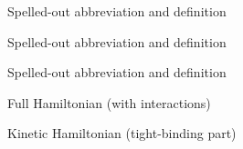 \begin{description}[PUTLONGEST]
    \item[ABC]{Spelled-out abbreviation and definition}
    \item[BABI]{Spelled-out abbreviation and definition}
    \item[CABR]{Spelled-out abbreviation and definition}
\end{description}

\begin{description}[PUTLONGEST]
    \item[$\MH$]{Full Hamiltonian (with interactions)}
    \item[$\MH_0$]{Kinetic Hamiltonian (tight-binding part)}
\end{description}
